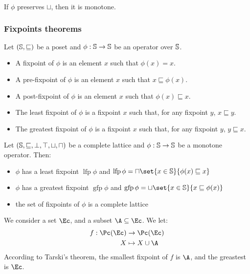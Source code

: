 \documentclass[toc]{../cs-classes/cs-classes}
\DeclareMathOperator{\lfp}{lfp}
\DeclareMathOperator{\gfp}{gfp}
\begin{document}
\begin{property}
    If $\phi$ preserves $\sqcup$, then it is monotone.
\end{property}

\subsubsection{Fixpoints theorems}
\begin{definition}[Fixpoints]
    Let $(\S, \sqsubseteq)$ be a poset and $\phi:\S\to\S$ be an operator over $\S$.
    \begin{itemize}
        \item A fixpoint of $\phi$ is an element $x$ such that $\phi(x)=x$.
        \item A pre-fixpoint of $\phi$ is an element $x$ such that $x\sqsubseteq\phi(x)$.
        \item A post-fixpoint of $\phi$ is an element $x$ such that $\phi(x)\sqsubseteq x$.
        \item The least fixpoint of $\phi$ is a fixpoint $x$ such that, for any fixpoint $y$, $x\sqsubseteq y$.
        \item The greatest fixpoint of $\phi$ is a fixpoint $x$ such that, for any fixpoint $y$, $y\sqsubseteq x$.
    \end{itemize}
\end{definition}

\begin{theorem}[Tarski's]
    Let $(\S, \sqsubseteq, \bot, \top, \sqcup, \sqcap)$ be a complete lattice and $\phi:\S\to\S$ be a monotone operator. Then:
    \begin{itemize}
        \item $\phi$ has a least fixpoint $\lfp\phi$ and $\lfp\phi = \sqcap\set{x\in\S}{\phi(x)\sqsubseteq x}$
        \item $\phi$ has a greatest fixpoint $\gfp\phi$ and $\gfp\phi = \sqcup\set{x\in\S}{x\sqsubseteq\phi(x)}$
        \item the set of fixpoints of $\phi$ is a complete lattice
    \end{itemize}
\end{theorem}

\begin{example}
    We consider a set $\Ec$, and a subset $\A\subseteq\Ec$. We let:
    \begin{equation*}
        \begin{aligned}
            f:\Pc(\Ec) &\to \Pc(\Ec)\\
            X &\mapsto X\cup\A
        \end{aligned}
    \end{equation*}
    According to Tarski's theorem, the smallest fixpoint of $f$ is $\A$, and the greastest is $\Ec$.
\end{example}
\end{document}
